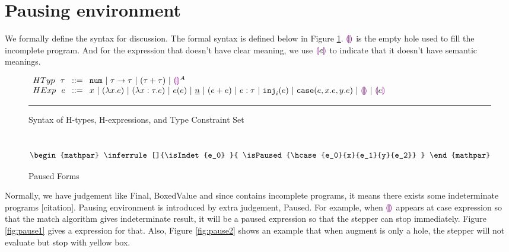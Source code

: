 \section{Pausing environment}

We formally define the syntax for discussion. The formal syntax is defined below in Figure \ref{fig:syntax}. $\textcolor{violet}{\llparenthesis}\textcolor{violet}{\rrparenthesis}$ is the empty hole used to fill the incomplete program. And for the expression that doesn't have clear meaning, we use $\textcolor{violet}{\llparenthesis} e \textcolor{violet}{\rrparenthesis}$ to indicate that it doesn't have semantic meanings.

\begin{figure}[htbp]
    \vspace{-3px} 
  $\arraycolsep=4pt\begin{array}{lll}
  HTyp~~ \tau & ::= &
    \tnum  ~\vert~
    \tarr{\tau}{\tau} ~\vert~
    (\tau + \tau) ~\vert~
    \ehole^A
    \\
  HExp~~ e & ::= &
    x ~\vert~
    \lamfunc{x}{e} ~\vert~
    \lamfunc{x:\tau}{e} ~\vert~
    e(e) ~\vert~
    \underlinenum{n} ~\vert~
    (e+e) ~\vert~
    e: \tau ~\vert~
    \hinj{i}{e} ~\vert~
    \hcase{e}{x}{e}{y}{e}~\vert~
    \ehole  ~\vert~
    \notehole{e} 
  \end{array}$
  \hrule
  \caption{Syntax of H-types, H-expressions, and Type Constraint Set}
    \label{fig:syntax}
    \vspace{-5px}
\end{figure}

\begin{figure}[htbp]
    \vspace{-3px} 
    ~~\hfill
    \begin{subequations}\label{eqns:paused}
    \begin{mathpar}
        \inferrule[]{\isIndet{e_0}
            }{
              \isPaused{\hcase{e_0}{x}{e_1}{y}{e_2}}
            }
    \end{mathpar}
  \end{subequations}
  \caption{Paused Forms}
  \label{fig:paused_forms}
    \vspace{-5px}
\end{figure}

Normally, we have judgement like Final, BoxedValue and since \Hazel contains incomplete programs, it means there exists some indeterminate programs [citation]. Pausing environment is introduced by extra judgement, Paused. For example, when $\textcolor{violet}{\llparenthesis}\textcolor{violet}{\rrparenthesis}$ appears at case expression so that the match algorithm gives indeterminate result, it will be a paused expression so that the stepper can stop immediately. Figure \ref{fig:pause1} gives a expression for that. Also, Figure \ref{fig:pause2} shows an example that when augment is only a hole, the stepper will not evaluate but stop with yellow box.

